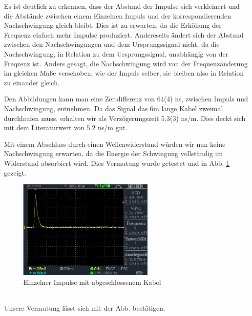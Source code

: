 \documentclass[a4paper,10pt]{article}
\numberwithin{equation}{section}
\begin{document}
Es ist deutlich zu erkennen, dass der Abstand der Impulse sich verkleinert und die Abstände zwischen einem Einzelnen Impuls und der korrespondierenden Nachschwingung gleich bleibt. Dies ist zu erwarten, da die Erhöhung der Frequenz einfach mehr Impulse produziert. Andereseits ändert sich der Abstand zwischen den Nachschwingungen und dem Ursprungssignal nicht, da die Nachschwingung, in Relation zu dem Ursprungssignal, unabhängig von der Freqzenz ist. Anders gesagt, die Nachschwingung wird von der Frequenzänderung im gleichen Maße verschoben, wie der Impuls selber, sie bleiben also in Relation zu einander gleich.

Den Abbildungen kann man eine Zeitdifferenz von 64(4) ns, zwischen Impuls und Nachschwingung, entnehmen. Da das Signal das 6m lange Kabel zweimal durchlaufen muss, erhalten wir als Verzögerungszeit 5.3(3) ns/m. Dies deckt sich mit dem Literaturwert von 5.2 ns/m gut.

Mit einem Abschluss durch einen Wellenwiderstand würden wir nun keine Nachschwingung erwarten, da die Energie der Schwingung vollständig im Widerstand absorbiert wird. Dies Vermutung wurde getestet und in Abb. \ref{fig:3.10} gezeigt.
\begin{figure}[h]
        \centering
        \includegraphics[width=0.6\textwidth]{data/DS0026.BMP.png}
        \caption{Einzelner Impulse mit abgeschlossenem Kabel}
		\label{fig:3.10}
\end{figure}\\
Unsere Vermutung lässt sich mit der Abb. bestätigen.

\clearpage
\end{document}
